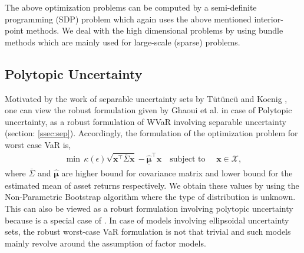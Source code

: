 The above optimization problems can be computed by a semi-definite programming (SDP) problem which again uses the above mentioned interior-point methods. We deal with the high dimensional problems by using bundle methods which are mainly used for large-scale (sparse) problems.

\subsection{Polytopic Uncertainty}

Motivated by the work of separable uncertainty sets by T{\"u}t{\"u}nc{\"u} and Koenig \cite{tutuncu}, one can view the robust formulation given by Ghaoui et al. \cite{ghaoui03} in case of Polytopic uncertainty, as a robust formulation of WVaR involving separable uncertainty (section: \ref{ssec:sep}). Accordingly, the formulation of the optimization problem for worst case VaR is,
\begin{equation}
\begin{split}
\min \, \kappa(\epsilon)\sqrt{\mathbf{x}^{\top}\overline{\Sigma}\mathbf{x}} - \underline{\hat{\boldsymbol{\mu}}}^{\top}\mathbf{x} \quad \text{subject to } \quad \mathbf{x} \in \mathcal{X},
\end{split}
\label{fig:var_poly}
\end{equation}
where $\overline{\Sigma}$ and $\underline{\hat{\boldsymbol{\mu}}}$ are higher bound for covariance matrix and lower bound for the estimated mean of asset returns respectively. We obtain these values by using the Non-Parametric Bootstrap algorithm where the type of distribution is unknown. This can also be viewed as a robust formulation involving polytopic uncertainty because  is a special case of . In case of models involving ellipsoidal uncertainty sets, the robust worst-case VaR formulation is not that trivial and such models mainly revolve around the assumption of factor models.

